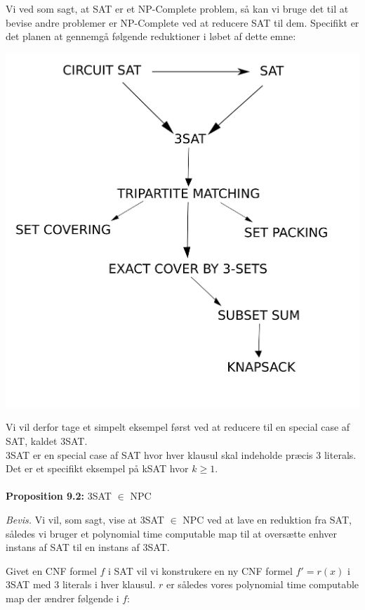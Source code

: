 Vi ved som sagt, at SAT er et NP-Complete problem, så kan vi bruge det til at bevise andre problemer er NP-Complete ved at reducere SAT til dem.
Specifikt er det planen at gennemgå følgende reduktioner i løbet af dette emne:
\begin{center}
 \includegraphics[bb=0 0 400 400,scale=0.5]{./GraphReductionTreeSetNumbers.png}
\end{center}

Vi vil derfor tage et simpelt eksempel først ved at reducere til en special case af SAT, kaldet 3SAT.\\
3SAT er en special case af SAT hvor hver klausul skal indeholde præcis 3 literals. Det er et specifikt eksempel på kSAT hvor $k \geq 1$.\\
~\\
\textbf{Proposition 9.2:} 3SAT $\in$ NPC

\emph{Bevis.} Vi vil, som sagt, vise at 3SAT $\in$ NPC ved at lave en reduktion fra SAT, således vi bruger et polynomial time computable map til at oversætte enhver instans af SAT til en instans af 3SAT. 

Givet en CNF formel $f$ i SAT vil vi konstrukere en ny CNF formel $f' = r(x)$ i 3SAT med 3 literals i hver klausul. $r$ er således vores polynomial time computable map der ændrer følgende i $f$:\\


